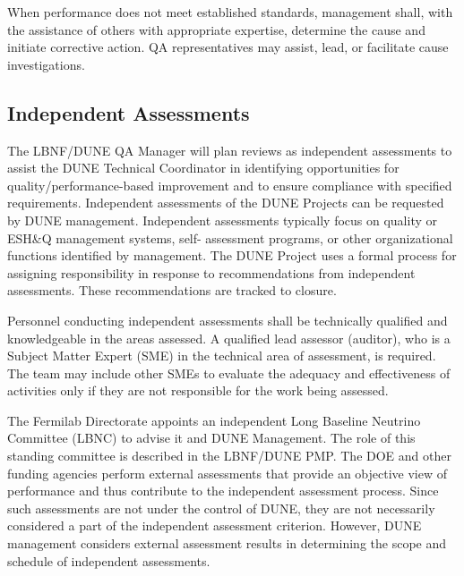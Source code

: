 When performance does not meet established standards, management
shall, with the assistance of others with appropriate expertise,
determine the cause and initiate corrective action. QA representatives
may assist, lead, or facilitate cause investigations.

\subsection{Independent Assessments}

The LBNF/DUNE QA Manager will plan reviews as independent assessments
to assist the DUNE Technical Coordinator in identifying opportunities
for quality/performance-based improvement and to ensure compliance
with specified requirements. Independent assessments of the DUNE
Projects can be requested by DUNE management. Independent assessments
typically focus on quality or ESH\&Q management systems, self-
assessment programs, or other organizational functions identified by
management. The DUNE Project uses a formal process for assigning
responsibility in response to recommendations from independent
assessments. These recommendations are tracked to closure.

Personnel conducting independent assessments shall be technically
qualified and knowledgeable in the areas assessed. A qualified lead
assessor (auditor), who is a Subject Matter Expert (SME) in the
technical area of assessment, is required. The team may include other
SMEs to evaluate the adequacy and effectiveness of activities only if
they are not responsible for the work being assessed.

The Fermilab Directorate appoints an independent Long Baseline
Neutrino Committee (LBNC) to advise it and DUNE Management. The role
of this standing committee is described in the LBNF/DUNE PMP. The DOE
and other funding agencies perform external assessments that provide
an objective view of performance and thus contribute to the
independent assessment process. Since such assessments are not under
the control of DUNE, they are not necessarily considered a part of the
independent assessment criterion. However, DUNE management considers
external assessment results in determining the scope and schedule of
independent assessments.


